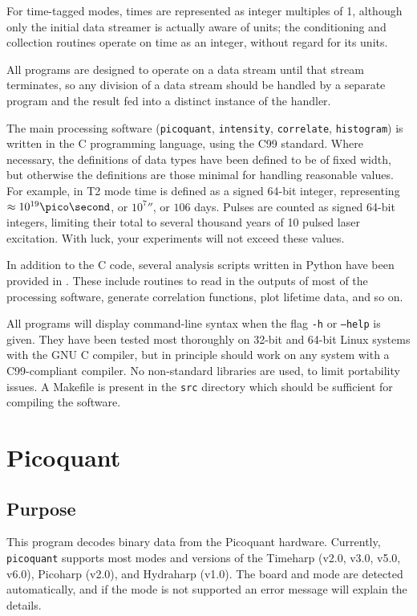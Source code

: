 \documentclass{article}
\newcommand{\picoquant}{\texttt{picoquant}}
\newcommand{\intensity}{\texttt{intensity}}
\newcommand{\correlate}{\texttt{correlate}}
\newcommand{\histogram}{\texttt{histogram}}
\begin{document}
For time-tagged modes, times are represented as integer multiples of 1\pico\second, although only the initial data streamer is actually aware of units; the conditioning and collection routines operate on time as an integer, without regard for its units.

All programs are designed to operate on a data stream until that stream terminates, so any division of a data stream should be handled by a separate program and the result fed into a distinct instance of the handler. 

The main processing software (\picoquant, \intensity, \correlate, \histogram) is written in the C programming language, using the C99 standard. Where necessary, the definitions of data types have been defined to be of fixed width, but otherwise the definitions are those minimal for handling reasonable values. For example, in T2 mode time is defined as a signed 64-bit integer, representing $\approx 10^{19}\pico\second$, or $10^{7}\second$, or $106$ days. Pulses are counted as signed 64-bit integers, limiting their total to several thousand years of 10\mega\hertz{} pulsed laser excitation. With luck, your experiments will not exceed these values. 

In addition to the C code, several analysis scripts written in Python have been provided in . These include routines to read in the outputs of most of the processing software, generate correlation functions, plot lifetime data, and so on. 

All programs will display command-line syntax when the flag \texttt{-h} or \texttt{--help} is given. They have been tested most thoroughly on 32-bit and 64-bit Linux systems with the GNU C compiler, but in principle should work on any system with a C99-compliant compiler. No non-standard libraries are used, to limit portability issues. A Makefile is present in the \texttt{src} directory which should be sufficient for compiling the software.

\section{Picoquant}
\subsection{Purpose}
This program decodes binary data from the Picoquant hardware. Currently, \picoquant{} supports most modes and versions of the Timeharp (v2.0, v3.0, v5.0, v6.0), Picoharp (v2.0), and Hydraharp (v1.0). The board and mode are detected automatically, and if the mode is not supported an error message will explain the details.
\end{document}
